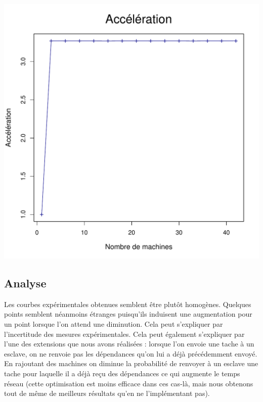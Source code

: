 \documentclass[a4paper, 11pt, titlepage]{article}
\begin{document}
\begin{center}
    \includegraphics[scale=0.45]{res/sujet_makefiles_premier_Makefile_nth8_acc.pdf}
\end{center}

\subsection {Analyse}

Les courbes expérimentales obtenues semblent être plutôt homogènes. Quelques points semblent néanmoins étranges puisqu'ils induisent une augmentation pour un point lorsque l'on attend une diminution. Cela peut s'expliquer par l'incertitude des mesures expérimentales. Cela peut également s'expliquer par l'une des extensions que nous avons réalisées : lorsque l'on envoie une tache à un esclave, on ne renvoie pas les dépendances qu'on lui a déjà précédemment envoyé. En rajoutant des machines on diminue la probabilité de renvoyer à un esclave une tache pour laquelle il a déjà reçu des dépendances ce qui augmente le temps réseau (cette optimisation est moins efficace dans ces cas-là, mais nous obtenons tout de même de meilleurs résultats qu'en ne l'implémentant pas).
\end{document}

